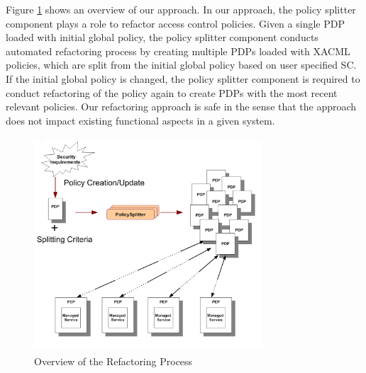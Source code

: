Figure \ref{overallprocess} shows an overview of our approach.
In our approach, the policy splitter component plays a role to refactor access control policies.
Given a single PDP loaded with initial global policy, the policy splitter component conducts automated refactoring process by creating multiple PDPs loaded with XACML policies, which are split from the initial global policy based on user specified SC. 
If the initial global policy is changed, the policy splitter component is required to conduct refactoring of the policy again to create PDPs with the most recent relevant policies.
Our refactoring approach is safe in the sense that the approach does not impact existing functional aspects in a given
system. 


\begin{figure}[!h]
\begin{center}
\includegraphics[width=8.5cm, height=8cm]{Overall-process}
\caption{Overview of the Refactoring Process}
\label{overallprocess}
\end{center}
\end{figure} 

